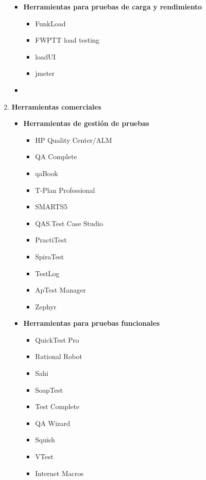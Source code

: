 \documentclass[12pt,a4paper,oneside]{book}
\begin{document}
\begin{enumerate}
\begin{itemize}
\begin{enumerate}
\begin{itemize}
\begin{itemize}
									\end{itemize}
								\item \textbf{Herramientas para pruebas de carga y rendimiento }
									\begin{itemize}
										\item FunkLoad
										\item FWPTT load testing
										\item loadUI
										\item jmeter
									\end{itemize}
								\item
								
							\end{itemize}
						
						\item \textbf{Herramientas comerciales}
						
							\begin{itemize}
								\item \textbf{Herramientas de gestión de pruebas} 
									\begin{itemize}
										\item HP Quality Center/ALM
										\item QA Complete
										\item qaBook
										\item T-Plan Professional
										\item SMARTS5
										\item QAS.Test Case Studio
										\item PractiTest
										\item SpiraTest
										\item TestLog
										\item ApTest Manager
										\item Zephyr
								
									\end{itemize}
								\item \textbf{Herramientas para pruebas funcionales}
									\begin{itemize}
										\item QuickTest Pro
										\item Rational Robot
										\item Sahi
										\item SoapTest
										\item Test Complete
										\item QA Wizard
										\item Squish
										\item VTest
										\item Internet Macros
										

\end{itemize}
\end{itemize}
\end{enumerate}
\end{itemize}
\end{enumerate}
\end{document}
